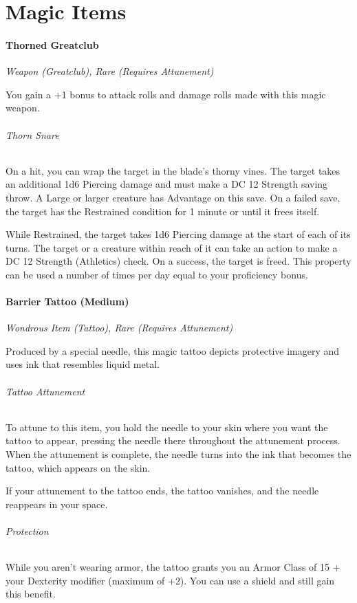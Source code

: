 \documentclass[letterpaper,openany,oneside,twocolumn]{book}
\begin{document}
\part*{Magic Items}
\subsection*{Thorned Greatclub}
\textit{Weapon (Greatclub), Rare (Requires Attunement)}\\
{\entryfont You gain a +1 bonus to attack rolls and damage rolls made with this magic weapon.

\paragraph*{Thorn Snare} On a hit, you can wrap the target in the blade’s thorny vines. The target takes an additional 1d6 Piercing damage and must make a DC 12 Strength saving throw. A Large or larger creature has Advantage on this save. On a failed save, the target has the Restrained condition for 1 minute or until it frees itself.

While Restrained, the target takes 1d6 Piercing damage at the start of each of its turns. The target or a creature within reach of it can take an action to make a DC 12 Strength (Athletics) check. On a success, the target is freed. This property can be used a number of times per day equal to your proficiency bonus.}

\subsection*{Barrier Tattoo (Medium)}
\textit{Wondrous Item (Tattoo), Rare (Requires Attunement)}\\
{\entryfont Produced by a special needle, this magic tattoo depicts protective imagery and uses ink that resembles liquid metal.

\paragraph*{Tattoo Attunement} To attune to this item, you hold the needle to your skin where you want the tattoo to appear, pressing the needle there throughout the attunement process. When the attunement is complete, the needle turns into the ink that becomes the tattoo, which appears on the skin.

If your attunement to the tattoo ends, the tattoo vanishes, and the needle reappears in your space.

\paragraph*{Protection} While you aren't wearing armor, the tattoo grants you an Armor Class of 15 + your Dexterity modifier (maximum of +2). You can use a shield and still gain this benefit.}
\end{document}
